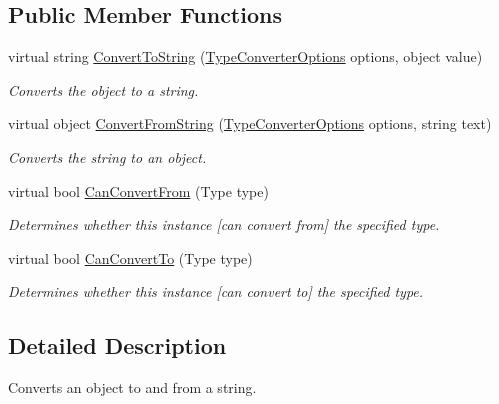\subsection*{Public Member Functions}
\begin{DoxyCompactItemize}
\item 
virtual string \hyperlink{a00066_a36cb2f9b24f15a671293f3a722324c27}{Convert\-To\-String} (\hyperlink{a00152}{Type\-Converter\-Options} options, object value)
\begin{DoxyCompactList}\small\item\em Converts the object to a string. \end{DoxyCompactList}\item 
virtual object \hyperlink{a00066_a804ea00060e1de70e5151f90d3bfce9b}{Convert\-From\-String} (\hyperlink{a00152}{Type\-Converter\-Options} options, string text)
\begin{DoxyCompactList}\small\item\em Converts the string to an object. \end{DoxyCompactList}\item 
virtual bool \hyperlink{a00066_a470d21adaa704eb281250dbd112ff91a}{Can\-Convert\-From} (Type type)
\begin{DoxyCompactList}\small\item\em Determines whether this instance \mbox{[}can convert from\mbox{]} the specified type. \end{DoxyCompactList}\item 
virtual bool \hyperlink{a00066_acb65bd8c8199d88d5b1629ae35d18514}{Can\-Convert\-To} (Type type)
\begin{DoxyCompactList}\small\item\em Determines whether this instance \mbox{[}can convert to\mbox{]} the specified type. \end{DoxyCompactList}\end{DoxyCompactItemize}


\subsection{Detailed Description}
Converts an object to and from a string. 




